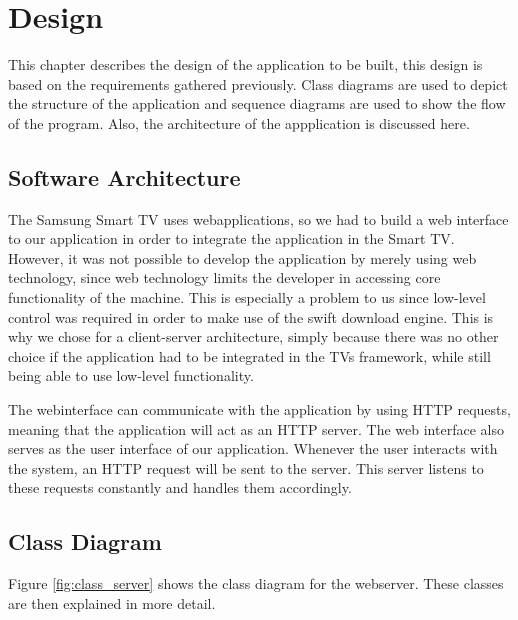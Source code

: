 \chapter{Design}
This chapter describes the design of the application to be built, this design is based on the requirements gathered previously.
Class diagrams are used to depict the structure of the application and sequence diagrams are used to show the flow of the program.
Also, the architecture of the appplication is discussed here.

\section{Software Architecture}
The Samsung Smart TV uses webapplications, so we had to build a web interface to our application in order to integrate the application in the Smart TV.
However, it was not possible to develop the application by merely using web technology, since web technology limits the developer in accessing core functionality of the machine.
This is especially a problem to us since low-level control was required in order to make use of the swift download engine. This is why we chose for a client-server architecture,
simply because there was no other choice if the application had to be integrated in the TV\textquotesingle s framework, while still being able to use low-level functionality.

The webinterface can communicate with the application by using HTTP requests, meaning that the application will act as an HTTP server.
The web interface also serves as the user interface of our application. Whenever the user interacts with the system,
an HTTP request will be sent to the server. This server listens to these requests constantly and handles them accordingly.

\section{Class Diagram}
Figure \ref{fig:class_server} shows the class diagram for the webserver. These classes are then explained in more detail.

